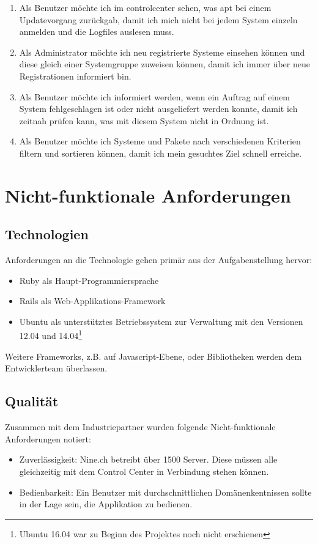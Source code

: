 \begin{enumerate}
    \item Als Benutzer möchte ich im \gls{controlcenter} sehen, was \gls{apt} bei einem Updatevorgang zurückgab, damit ich mich nicht bei jedem System einzeln anmelden und die Logfiles auslesen muss.
    \item Als Administrator möchte ich neu registrierte Systeme einsehen können und diese gleich einer Systemgruppe zuweisen können, damit ich immer über neue Registrationen informiert bin.
    \item Als Benutzer möchte ich informiert werden, wenn ein Auftrag auf einem System fehlgeschlagen ist oder nicht ausgeliefert werden konnte, damit ich zeitnah prüfen kann, was mit diesem System nicht in Ordnung ist.
    \item Als Benutzer möchte ich Systeme und Pakete nach verschiedenen Kriterien filtern und sortieren können, damit ich mein gesuchtes Ziel schnell erreiche.
\end{enumerate}


\section{Nicht-funktionale Anforderungen}


\subsection*{Technologien}

Anforderungen an die Technologie gehen primär aus der Aufgabenstellung hervor:

\begin{itemize}
    \item Ruby als Haupt-Programmiersprache
    \item Rails als Web-Applikations-Framework
    \item Ubuntu als unterstütztes Betriebssystem zur Verwaltung mit den Versionen 12.04 und 14.04\footnote{Ubuntu 16.04 war zu Beginn des Projektes noch nicht erschienen}
\end{itemize}

Weitere Frameworks, z.B. auf Javascript-Ebene, oder Bibliotheken werden dem Entwicklerteam überlassen.

\subsection*{Qualität}

Zusammen mit dem Industriepartner wurden folgende Nicht-funktionale Anforderungen notiert:

\begin{itemize}
\item Zuverlässigkeit: Nine.ch betreibt über 1500 Server. Diese müssen alle gleichzeitig mit dem Control Center in Verbindung stehen können.
\item Bedienbarkeit: Ein Benutzer mit durchschnittlichen Domänenkentnissen sollte in der Lage sein, die Applikation zu bedienen.
\end{itemize}